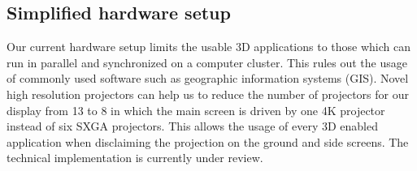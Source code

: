 \subsection{Simplified hardware setup}
\label{simplified-hardware-setup}

Our current hardware setup limits the usable 3D applications to those which can run in parallel and synchronized on a computer cluster. This rules out the usage of commonly used software such as geographic information systems (GIS). Novel high resolution projectors can help us to reduce the number of projectors for our display from 13 to 8 in which the main screen is driven by one 4K projector instead of six SXGA projectors. This allows the usage of every 3D enabled application when disclaiming the projection on the ground and side screens. The technical implementation is currently under review.







